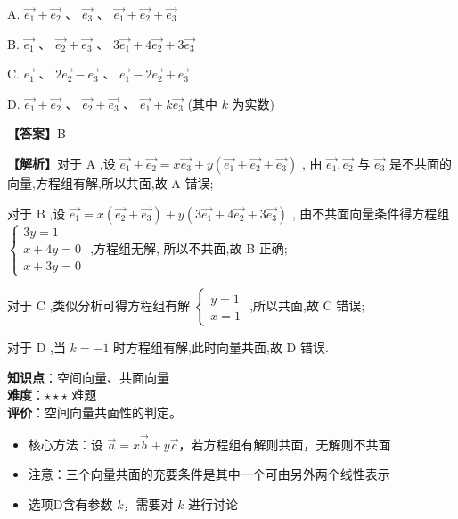 \documentclass[10pt]{article}
\begin{document}
A. \(\overrightarrow{{e}_{1}} + \overrightarrow{{e}_{2}}\text{ 、 }\overrightarrow{{e}_{3}}\text{ 、 }\overrightarrow{{e}_{1}} + \overrightarrow{{e}_{2}} + \overrightarrow{{e}_{3}}\)

B. \(\overrightarrow{{e}_{1}}\text{ 、 }\overrightarrow{{e}_{2}} + \overrightarrow{{e}_{3}}\text{ 、 }3\overrightarrow{{e}_{1}} + 4\overrightarrow{{e}_{2}} + 3\overrightarrow{{e}_{3}}\)

C. \(\overrightarrow{{e}_{1}}\text{ 、 }2\overrightarrow{{e}_{2}} - \overrightarrow{{e}_{3}}\text{ 、 }\overrightarrow{{e}_{1}} - 2\overrightarrow{{e}_{2}} + \overrightarrow{{e}_{3}}\)

D. \(\overrightarrow{{e}_{1}} + \overrightarrow{{e}_{2}}\text{ 、 }\overrightarrow{{e}_{2}} + \overrightarrow{{e}_{3}}\text{ 、 }\overrightarrow{{e}_{1}} + k\overrightarrow{{e}_{3}}\) (其中 \(k\) 为实数)

\textbf{【答案】}B

\textbf{【解析】}对于 \(\mathrm{A}\) ,设 \(\overrightarrow{{e}_{1}} + \overrightarrow{{e}_{2}} = x\overrightarrow{{e}_{3}} + y\left( {\overrightarrow{{e}_{1}} + \overrightarrow{{e}_{2}} + \overrightarrow{{e}_{3}}}\right)\) ,
由 \(\overrightarrow{{e}_{1}},\overrightarrow{{e}_{2}}\) 与 \(\overrightarrow{{e}_{3}}\) 是不共面的向量,方程组有解,所以共面,故 A 错误;

对于 \(\mathrm{B}\) ,设 \(\overrightarrow{{e}_{1}} = x\left( {\overrightarrow{{e}_{2}} + \overrightarrow{{e}_{3}}}\right)  + y\left( {3\overrightarrow{{e}_{1}} + 4\overrightarrow{{e}_{2}} + 3\overrightarrow{{e}_{3}}}\right)\) ,
由不共面向量条件得方程组 \(\left\{  \begin{array}{l} {3y} = 1 \\  x + {4y} = 0 \\  x + {3y} = 0 \end{array}\right.\) ,方程组无解, 所以不共面,故 B 正确;

对于 \(\mathrm{C}\) ,类似分析可得方程组有解 \(\left\{  \begin{array}{l} y = 1 \\  x = 1 \end{array}\right.\) ,所以共面,故 C 错误;

对于 \(\mathrm{D}\) ,当 \(k =  - 1\) 时方程组有解,此时向量共面,故 D 错误.

\begin{analysisbox}[考点分析]
\textbf{知识点}：空间向量、共面向量\\
\textbf{难度}：\(\star\star\star\) 难题\\
\textbf{评价}：空间向量共面性的判定。
\begin{itemize}
\item 核心方法：设 \(\vec{a} = x\vec{b} + y\vec{c}\)，若方程组有解则共面，无解则不共面
\item 注意：三个向量共面的充要条件是其中一个可由另外两个线性表示
\item 选项D含有参数 \(k\)，需要对 \(k\) 进行讨论
\end{itemize}
\end{analysisbox}
\end{document}
